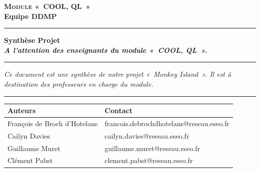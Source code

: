 \documentclass[a4paper,11pt,titlepage]{article}
\newcommand{\TypeDocument}{Synthèse Projet}
\newcommand{\AuteurPrincipal}{Clément Pabst}
\newcommand{\NomGroupeDocument}{Equipe DDMP}
\newcommand{\IntituleDocument}{Module «~COOL, QL~»}
\newcommand{\PorteeDocument}{A l'attention des enseignants du module «~COOL, QL~».}
\begin{document}
\setlength\parindent{0pt}
\sloppy%
\renewcommand{\arraystretch}{1.5}


\vspace{-2cm}
\begin{center}
{\Large {\textsc{\bf \IntituleDocument}}}
\vspace{0.4cm}\\
{\large\bf \NomGroupeDocument}

\rule[0.5ex]{0.52\textwidth}{0.1mm}

\vspace{0.2cm}
{\Large\bf{\TypeDocument}}
\vspace{0.2cm}\\
{\Large\bf\textit{\PorteeDocument}}
\end{center}

\vspace{-0.2cm}
\noindent\rule[0.5ex]{\textwidth}{0.1mm}
\textit{Ce document est une synthèse de notre projet «~Monkey Island~». Il est à destination des professeurs en charge du module.}\\
\rule[0.5ex]{\textwidth}{0.1mm}

\vspace{1cm}
\begin{tabular}{|p{5cm}|p{9cm}|}
\hline
\textbf{Auteurs} & \textbf{Contact} \\\hline
François de Broch d'Hotelans & francois.debrochdhotelans@reseau.eseo.fr\\\hline
Cailyn Davies & cailyn.davies@reseau.eseo.fr\\\hline
Guillaume Muret & guillaume.muret@reseau.eseo.fr\\\hline
\AuteurPrincipal & clement.pabst@reseau.eseo.fr\\\hline
\end{tabular}
\newpage


\tableofcontents
\newpage


\newpage

\newpage

\end{document}
